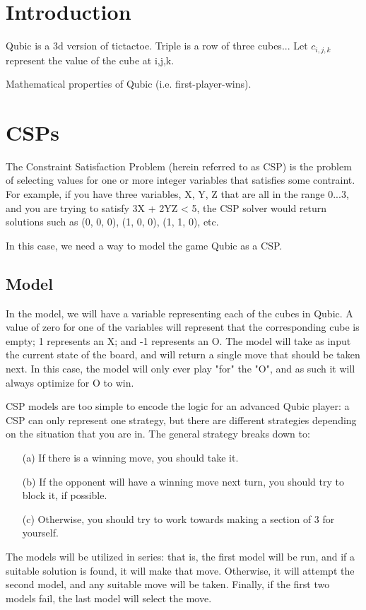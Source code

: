 \documentclass[11pt]{article}
\begin{document}

\section{Introduction}

Qubic is a 3d version of tictactoe.
Triple is a row of three cubes...
Let $c_{i, j, k}$ represent the value of the cube at i,j,k.

Mathematical properties of Qubic (i.e. first-player-wins).

\section{CSPs}
The Constraint Satisfaction Problem (herein referred to as CSP) is the problem of selecting values for one or more integer variables that satisfies some contraint. For example, if you have three variables, X, Y, Z that are all in the range 0...3, and you are trying to satisfy 3X + 2YZ < 5, the CSP solver would return solutions such as (0, 0, 0), (1, 0, 0), (1, 1, 0), etc.

In this case, we need a way to model the game Qubic as a CSP.

\subsection{Model}
In the model, we will have a variable representing each of the cubes in Qubic. A value of zero for one of the variables will represent that the corresponding cube is empty; 1 represents an X; and -1 represents an O. The model will take as input the current state of the board, and will return a single move that should be taken next. In this case, the model will only ever play "for" the "O", and as such it will always optimize for O to win.

CSP models are too simple to encode the logic for an advanced Qubic player: a CSP can only represent one strategy, but there are different strategies depending on the situation that you are in. The general strategy breaks down to:
\begin{enumerate}
    \item[(a)] If there is a winning move, you should take it.
    \item[(b)] If the opponent will have a winning move next turn, you should try to block it, if possible.
    \item[(c)] Otherwise, you should try to work towards making a section of 3 for yourself.
\end{enumerate}
The models will be utilized in series: that is, the first model will be run, and if a suitable solution is found, it will make that move. Otherwise, it will attempt the second model, and any suitable move will be taken. Finally, if the first two models fail, the last model will select the move.
\end{document}
